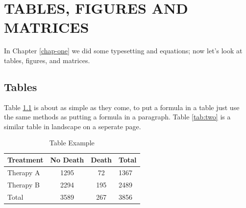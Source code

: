 \chapter{TABLES, FIGURES AND MATRICES}
\label{chap-two}
In Chapter \ref{chap-one} we did some typesetting and equations; now let's 
look at tables, figures, and matrices.

\section{Tables}
Table \ref{tab:one} is about as simple as they come, to put a formula in a 
table just use the same methods as putting a formula in a paragraph.  
Table \ref{tab:two} is a similar table in landscape on a seperate page.  
%
\begin{table}
\caption{Table Example}
\label{tab:one}
\begin{center}
\begin{tabular}{lccl}
\toprule
Treatment & No Death & Death & Total\\
\midrule
Therapy A & 1295 & 72 & 1367\\
Therapy B 	& 2294 & 195 & 2489\\
\midrule
Total & 3589 & 267 & 3856\\
\bottomrule
\end{tabular}
\end{center}
\end{table}

